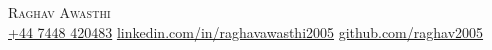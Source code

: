 \begin{center}
  {\fontsize{24pt}{25pt}\selectfont\scshape Raghav Awasthi}\\[2pt]
  \href{tel:+447448420483}{+44 7448 420483}
  \enspace\textbar\enspace
  \href{mailto:\ResumeEmail}{\ResumeEmail}
  \enspace\textbar\enspace
  \href{https://www.linkedin.com/in/raghavawasthi2005}{linkedin.com/in/raghavawasthi2005}
  \enspace\textbar\enspace
  \href{https://github.com/raghav2005}{github.com/raghav2005}
\end{center}
\vspace{-3pt}
